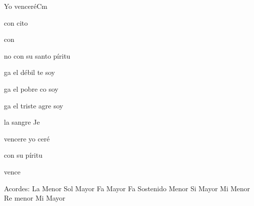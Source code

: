 \documentclass[12pt, spanish]{book}
\begin{document}
\begin{song}{Yo venceré}{Cm}
        \begin{SBExtraKeys}{




            \begin{SBChorus}
                  con cito

                  con 

                no con su santo píritu
            \end{SBChorus}

            \begin{SBOpGroup}
                ga el débil te soy

                ga el pobre co soy

                ga el triste agre soy

                 la sangre  Je
            \end{SBOpGroup}
            \vskip 20pt
            \begin{SBOpGroup}
                 vencere yo ceré

                con su píritu

                 vence
            \end{SBOpGroup}

            \ifChordBk
            \begin{SBOpGroup}
                Acordes:\break
                \upchord{\Am}\qquad La Menor \hfill
                \upchord{\G}\qquad Sol Mayor \hfill\null\break
                \upchord{\F}\qquad Fa Mayor \hfill
                \upchord{\Fsm}\qquad Fa Sostenido Menor \hfill\null\break
                \upchord{\B}\qquad Si Mayor \hfill
                \upchord{\Em}\qquad Mi Menor \hfill\null\break
                \upchord{\Dm}\qquad Re menor  \hfill
                \upchord{\E}\qquad Mi Mayor \hfill\null\break
            \end{SBOpGroup}
            \fi
        }\end{SBExtraKeys}
    \end{song}


    \ifChordBk
        
        \theendnotes
        
        
        
    \fi

    
\end{document}
